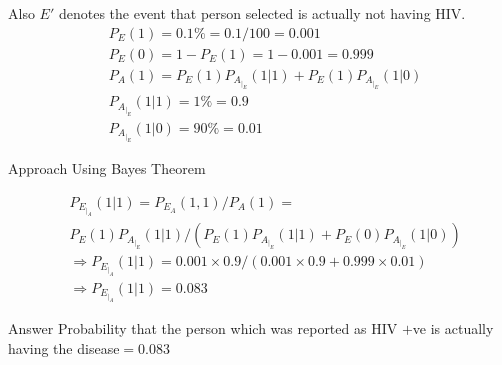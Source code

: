 \documentclass{beamer}
\begin{document}
	\begin{frame}
		Also    $E'$ denotes the event that person selected is actually not having HIV.
		\begin{align}
			&P_E(1)=0.1\%=0.1/100=0.001\\
			&P_E(0)=1-P_E(1)=1-0.001=0.999\\
			&P_A(1)=P_E(1)P_A_|_E(1|1)+P_E(1)P_A_|_E(1|0)\\
			&P_A_|_E(1|1)=1\%=0.9\\
			&P_A_|_E(1|0)=90\%=0.01
		\end{align}
		\begin{alertblock}{Approach}
			Using Bayes Theorem
		\end{alertblock}
		
		\begin{align}
			&P_E_|_A(1|1)=P_E_A(1,1)/P_A(1)=\\\nonumber
			&P_E(1)P_A_|_E(1|1)/(P_E(1)P_A_|_E(1|1)+P_E(0)P_A_|_E(1|0)) \\
			&\Rightarrow P_E_|_A(1|1)=0.001\times0.9/(0.001\times0.9+0.999\times0.01)\\
			&\Rightarrow P_E_|_A(1|1)=0.083 
		\end{align}
	\end{frame}
	
	\begin{frame}
		\begin{alertblock}{Answer}
			Probability that the person which was reported as HIV $+$ve is actually having the disease$=0.083$
		\end{alertblock}
	\end{frame}
	
\end{document}
